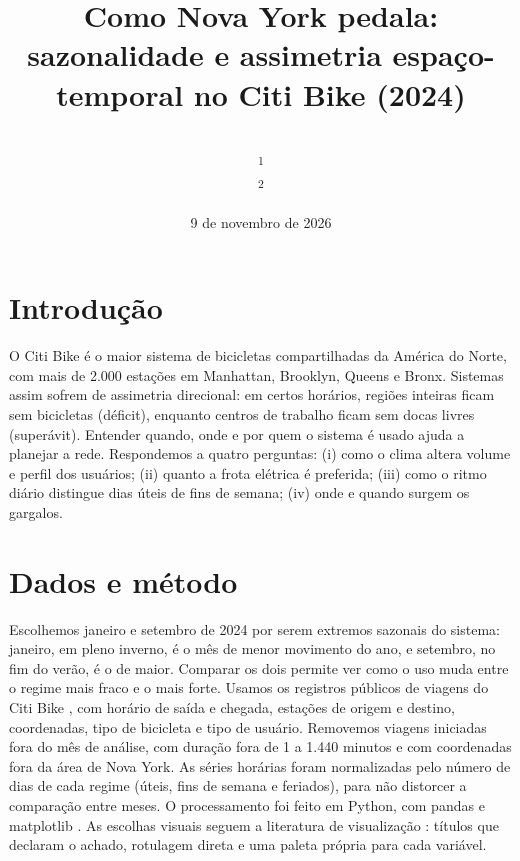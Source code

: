 \documentclass[10pt, a4paper, twocolumn]{article}
\title{Como Nova York pedala: sazonalidade e assimetria espaço-temporal no Citi Bike (2024)}
\author{
	\authorstyle{Tiago Brito\textsuperscript{1}, José Lima\textsuperscript{1}, Rafael Lima\textsuperscript{2}, Guilherme Rocha\textsuperscript{2}} \\
	\textsuperscript{1}\institution{Ciência da Computação, UFPB}\\
	\textsuperscript{2}\institution{Ciência de Dados e Inteligência Artificial, UFPB}\\
}
\date{9 de novembro de 2026}
\begin{document}
\maketitle
\thispagestyle{firstpage}



\section*{Introdução}

O Citi Bike é o maior sistema de bicicletas compartilhadas da América do Norte, com mais de 2.000 estações em Manhattan, Brooklyn, Queens e Bronx. Sistemas assim sofrem de assimetria direcional: em certos horários, regiões inteiras ficam sem bicicletas (déficit), enquanto centros de trabalho ficam sem docas livres (superávit). Entender quando, onde e por quem o sistema é usado ajuda a planejar a rede. Respondemos a quatro perguntas: (i) como o clima altera volume e perfil dos usuários; (ii) quanto a frota elétrica é preferida; (iii) como o ritmo diário distingue dias úteis de fins de semana; (iv) onde e quando surgem os gargalos.

\section*{Dados e método}

Escolhemos janeiro e setembro de 2024 por serem extremos sazonais do sistema: janeiro, em pleno inverno, é o mês de menor movimento do ano, e setembro, no fim do verão, é o de maior. Comparar os dois permite ver como o uso muda entre o regime mais fraco e o mais forte. Usamos os registros públicos de viagens do Citi Bike \citep{citibike}, com horário de saída e chegada, estações de origem e destino, coordenadas, tipo de bicicleta e tipo de usuário. Removemos viagens iniciadas fora do mês de análise, com duração fora de 1 a 1.440 minutos e com coordenadas fora da área de Nova York. As séries horárias foram normalizadas pelo número de dias de cada regime (úteis, fins de semana e feriados), para não distorcer a comparação entre meses. O processamento foi feito em Python, com pandas \citep{pandas} e matplotlib \citep{matplotlib}. As escolhas visuais seguem a literatura de visualização \citep{tufte1983,cleveland1984,wilke2019,ware2012,berinato2016}: títulos que declaram o achado, rotulagem direta e uma paleta própria para cada variável.
\end{document}
